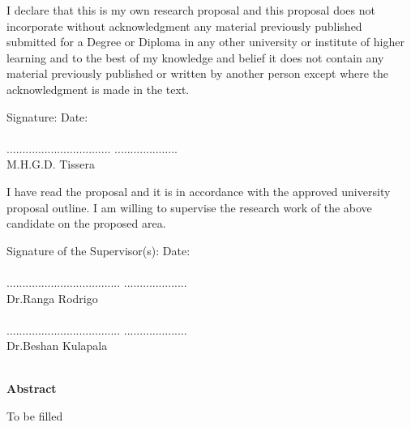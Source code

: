 \documentclass[a4paper,oneside,12pt]{report}
\begin{document}
I declare that this is my own research proposal and this proposal does not incorporate without acknowledgment any material previously published submitted for a Degree or Diploma in any other university or institute of higher learning and to the best of my knowledge and belief it does not contain any material previously published or written by another person except where the acknowledgment is made in the text.

Signature:  \hspace{7cm}  Date:\\
\\
................................. \hspace{5cm} ....................\\
M.H.G.D. Tissera

I have read the proposal and it is in accordance with the approved university proposal outline. I am willing to supervise the research work of the above candidate on the proposed area.

Signature of the Supervisor(s):  \hspace{3.25cm}  Date:\\
\\
.................................... \hspace{4.25cm} ....................\\
Dr.Ranga Rodrigo\\
\\
.................................... \hspace{4.25cm} ....................\\
Dr.Beshan Kulapala\\
\\


\clearpage


\begin{flushleft}
	\large
	\textbf{Abstract}
\end{flushleft}
\small

To be filled 

\cite{R01} \cite{R02} \cite{R03} \cite{R04} \cite{R05} \cite{R06} \cite{R07} \cite{R08} \cite{R09} \cite{R10} \cite{R11} \cite{R12} \cite{R13} \cite{R14} \cite{R15} \cite{R16} \cite{R17} \cite{R18} \cite{R19} \cite{R20} \cite{R21} \cite{R22} \cite{R23} \cite{R24} \cite{R25} \cite{R26} \cite{R27} \cite{R28} \cite{R29} \cite{R30} \cite{R31} \cite{R32} \cite{R33} \cite{R34} \cite{R35} \cite{R36} \cite{R37} \cite{R38} \cite{R39} \cite{R40} \cite{R41} \cite{R42} \cite{R43} \cite{R44} \cite{R45} \cite{R46} \cite{R47} \cite{R48}
\cite{R49} \cite{R50} \cite{R51} \cite{R52} \cite{R53} \cite{R54} \cite{R55} \cite{R56} \cite{R57} \cite{R58} \cite{R59} \cite{R60}
\cite{R61} \cite{R62} \cite{R63} \cite{R64} \cite{R65} \cite{R66}
\end{document}

